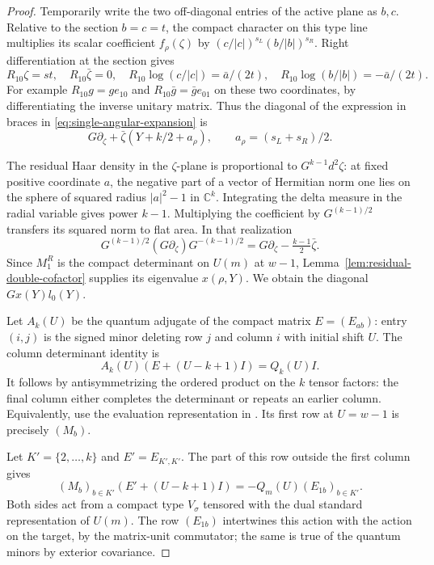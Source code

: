 \begin{proof}
Temporarily write the two off-diagonal entries of the active plane as
\(b,c\). Relative to the section \(b=c=t\), the compact character
on this type line multiplies its scalar coefficient \(f_\rho(\zeta)\)
by \((c/|c|)^{s_L}(b/|b|)^{s_R}\). Right differentiation at the section
gives
\[
 R_{10}\zeta=st,\quad R_{10}\bar\zeta=0,\quad
 R_{10}\log(c/|c|)=\bar a/(2t),\quad
 R_{10}\log(b/|b|)=-\bar a/(2t).
\]
For example \(R_{10}g=ge_{10}\) and
\(R_{10}\bar g=\bar g e_{01}\) on these two coordinates,
by differentiating the inverse unitary matrix.
Thus the diagonal of the expression in braces in
\eqref{eq:single-angular-expansion} is
\[
 G\partial_\zeta+\bar\zeta(Y+k/2+a_\rho),\qquad
                   a_\rho=(s_L+s_R)/2 .
\]

The residual Haar density in the \(\zeta\)-plane is proportional to
\(G^{k-1}d^2\zeta\): at fixed positive coordinate \(a\), the
negative part of a vector of Hermitian norm one lies on the sphere
of squared radius \(|a|^2-1\) in \(\mathbb C^k\). Integrating the
delta measure in the radial variable gives power \(k-1\).
Multiplying the coefficient by \(G^{(k-1)/2}\) transfers its squared
norm to flat area. In that realization
\[
 G^{(k-1)/2}(G\partial_\zeta)G^{-(k-1)/2}
        =G\partial_\zeta-\tfrac{k-1}{2}\bar\zeta .
\]
Since \(M_1^R\) is the compact determinant on \(U(m)\) at \(w-1\),
Lemma~\ref{lem:residual-double-cofactor} supplies its eigenvalue
\(x(\rho,Y)\). We obtain the diagonal \(Gx(Y)l_0(Y)\).

Let \(A_k(U)\) be the quantum adjugate of the compact matrix
\(E=(E_{ab})\): entry \((i,j)\) is the signed minor deleting row
\(j\) and column \(i\) with initial shift \(U\). The column
determinant identity is
\[
         A_k(U)(E+(U-k+1)I)=Q_k(U)I .
\]
It follows by antisymmetrizing the ordered product on the \(k\)
tensor factors: the final column either completes the determinant
or repeats an earlier column. Equivalently, use the evaluation
representation in \cite[Proposition~2.7(4) and
Remarks~2.8(1), 2.11]{mno-yangians}. Its first row at \(U=w-1\)
is precisely \((M_b)\).

Let \(K'=\{2,\ldots,k\}\) and \(E'=E_{K',K'}\). The part of
this row outside the first column gives
\[
 (M_b)_{b\in K'}(E'+(U-k+1)I)
          =-Q_m(U)(E_{1b})_{b\in K'} .
\]
Both sides act from a compact type \(V_\sigma\) tensored with the
dual standard representation of \(U(m)\). The row
\((E_{1b})\) intertwines this action with the action on the
target, by the matrix-unit commutator; the same is true of the
quantum minors by exterior covariance.


\end{proof}
